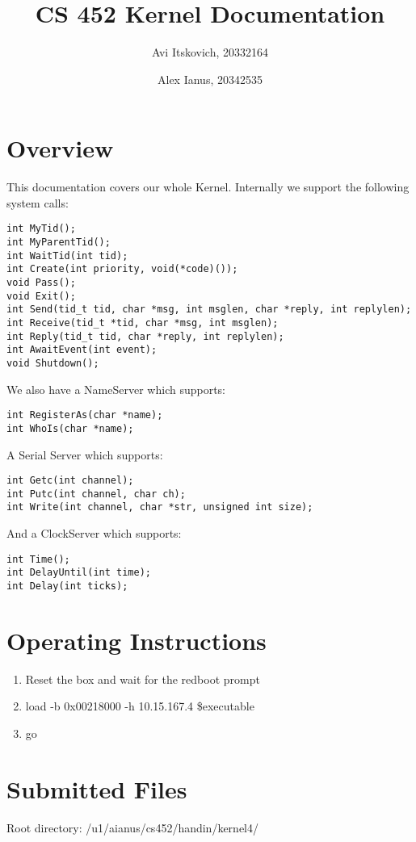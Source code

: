 \documentclass{article}
\title{CS 452 Kernel Documentation}
\author{
  Avi Itskovich, 20332164
  \and
  Alex Ianus, 20342535
}
\begin{document}
\maketitle

\section{Overview}

This documentation covers our whole Kernel. Internally we support the following system calls:

\begin{verbatim}
int MyTid();
int MyParentTid();
int WaitTid(int tid);
int Create(int priority, void(*code)());
void Pass();
void Exit();
int Send(tid_t tid, char *msg, int msglen, char *reply, int replylen);
int Receive(tid_t *tid, char *msg, int msglen);
int Reply(tid_t tid, char *reply, int replylen);
int AwaitEvent(int event);
void Shutdown();
\end{verbatim}

We also have a NameServer which supports:

\begin{verbatim}
int RegisterAs(char *name);
int WhoIs(char *name);
\end{verbatim}

A Serial Server which supports:

\begin{verbatim}
int Getc(int channel);
int Putc(int channel, char ch);
int Write(int channel, char *str, unsigned int size);
\end{verbatim}

And a ClockServer which supports:

\begin{verbatim}
int Time();
int DelayUntil(int time);
int Delay(int ticks);
\end{verbatim}

\section{Operating Instructions}
\begin{enumerate}
  \item Reset the box and wait for the redboot prompt
  \item load -b 0x00218000 -h 10.15.167.4 \$executable
  \item go
\end{enumerate}

\section{Submitted Files}
Root directory: /u1/aianus/cs452/handin/kernel4/
\end{document}
